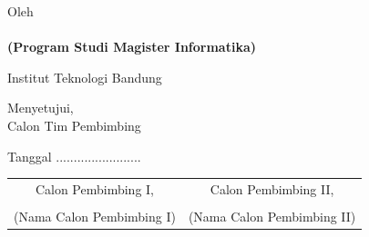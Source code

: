 \clearpage
\pagestyle{empty}


\begin{center}
    \smallskip

    \singlespacing
    \fontsize{14pt}{17pt}\selectfont \bfseries \MakeUppercase{\thetitle}
    
    \vspace{6\baselineskip}
    
   \normalsize \normalfont
    Oleh\\[0ex]
    \textbf{\fontsize{14pt}{17pt}\selectfont \theauthor} \\[0ex]
    \textbf{(Program Studi Magister Informatika)}
    
    Institut Teknologi Bandung \\

    \vspace{5\baselineskip}
    
    Menyetujui, \\
    Calon Tim Pembimbing

    \vspace{\baselineskip}

    Tanggal ........................
    
    \vspace{2\baselineskip}
    
    \setlength{\tabcolsep}{12pt}
    \begin{tabular}{c@{\hskip 1in}c}
        Calon Pembimbing I, & Calon Pembimbing II, \\[42pt]
        \underline{\hspace{5cm}} & \underline{\hspace{5cm}} \\[5mm]
        (Nama Calon Pembimbing I) & (Nama Calon Pembimbing II)
    \end{tabular}
    
\end{center}
\clearpage